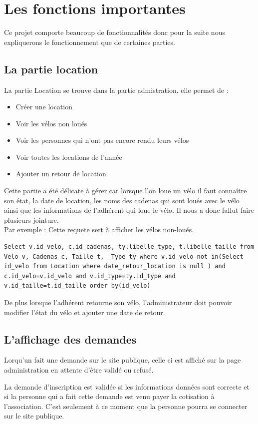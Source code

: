 \documentclass[11pt,a4paper,titlepage]{report}
\begin{document}
\section{Les fonctions importantes}
Ce projet comporte beaucoup de fonctionnalités donc pour la suite nous expliquerons le fonctionnement que de certaines parties.  
\subsection{La partie location}
La partie Location se trouve dans la partie admistration, elle permet de : 
\begin{itemize}
\item Créer une location
\item Voir les vélos non loués
\item Voir les personnes qui n'ont pas encore rendu leurs vélos
\item Voir toutes les locations de l'année
\item Ajouter un retour de location 
\end{itemize}

Cette partie a été délicate à gérer car lorsque l'on loue un vélo il faut connaître son état, la date de location, les noms des cadenas qui sont loués avec le vélo ainsi que les informations de l'adhérent qui loue le vélo. Il nous a donc fallut faire plusieurs jointure.\\

Par exemple : Cette requete sert à afficher les vélos non-loués. 
\begin{verbatim}
Select v.id_velo, c.id_cadenas, ty.libelle_type, t.libelle_taille from Velo v, Cadenas c, Taille t, _Type ty where v.id_velo not in(Select id_velo from Location where date_retour_location is null ) and c.id_velo=v.id_velo and v.id_type=ty.id_type and v.id_taille=t.id_taille order by(id_velo) 
\end{verbatim} 

De plus lorsque l'adhérent retourne son vélo, l'administrateur doit pouvoir modifier l'état du vélo et ajouter une date de retour. 

\subsection{L'affichage des demandes}
Lorqu'un fait une demande sur le site publique, celle ci est affiché sur la page administration en attente d'être validé ou refusé.

La demande d'inscription est validée si les informations données sont correcte et si la personne qui a fait cette demande est venu payer la cotisation à l'association. C'est seulement à ce moment que la personne pourra se connecter sur le site publique.
\end{document}
